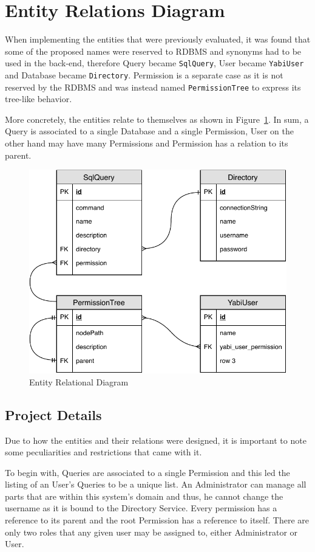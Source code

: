 \section{Entity Relations Diagram}\label{tities}
When implementing the entities that were previously evaluated, it was found that some of the proposed names were reserved to \gls{RDBMS} and synonyms had to be used in the back-end, therefore Query became \texttt{SqlQuery}, User became \texttt{YabiUser} and Database became \texttt{Directory}. Permission is a separate case as it is not reserved by the \gls{RDBMS} and was instead named \texttt{PermissionTree} to express its tree-like behavior.

More concretely, the entities relate to themselves as shown in Figure~\ref{fig:er}. In sum, a Query is associated to a single Database and a single Permission, User on the other hand may have many Permissions and Permission has a relation to its parent.

\begin{figure}
  \centering
  \includegraphics[width=.7\textwidth]{images/diagramas/er}
  \caption{Entity Relational Diagram}\label{fig:er}
\end{figure}

\subsection{Project Details}\label{p:details}
Due to how the entities and their relations were designed, it is important to note some peculiarities and restrictions that came with it.

To begin with, Queries are associated to a single Permission and this led the listing of an User's Queries to be a unique list. An Administrator can manage all parts that are within this system's domain and thus, he cannot change the username as it is bound to the Directory Service. Every permission has a reference to its parent and the root Permission has a reference to itself. There are only two roles that any given user may be assigned to, either Administrator or User.

